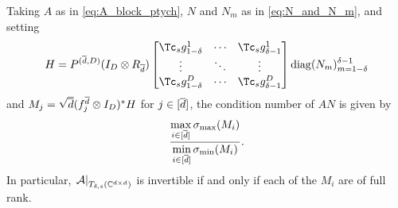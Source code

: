 \begin{proposition}
  Taking $A$ as in \eqref{eq:A_block_ptych}, $N$ and $N_m$ as in \eqref{eq:N_and_N_m}, and setting \[H = P^{(\dbar, D)} (I_D \otimes R_{\dbar}) \begin{bmatrix}  \Tc_s g_{1 - \delta}^1 & \cdots &  \Tc_s g_{\delta - 1}^1 \\ \vdots & \ddots & \vdots \\  \Tc_s g_{1 - \delta}^D & \cdots &  \Tc_s g_{\delta - 1}^D \end{bmatrix} \diag(N_m)_{m = 1 - \delta}^{\delta - 1}\] and $M_j = \sqrt{\overline{d}}(f_j^{\overline{d}} \otimes I_D)^* H$ for $j \in [\overline{d}]$, the condition number of $AN$ is given by \[\dfrac{\max\limits_{i \in [\overline{d}]} \sigma_{\max} (M_i)}{\min\limits_{i \in [\overline{d}]} \sigma_{\min} (M_i)}.\]  In particular, $\left.\mathcal{A}\right|_{T_{\delta, s}(\mathbb{C}^{d \times d})}$ is invertible if and only if each of the $M_i$ are of full rank.
\end{proposition}
